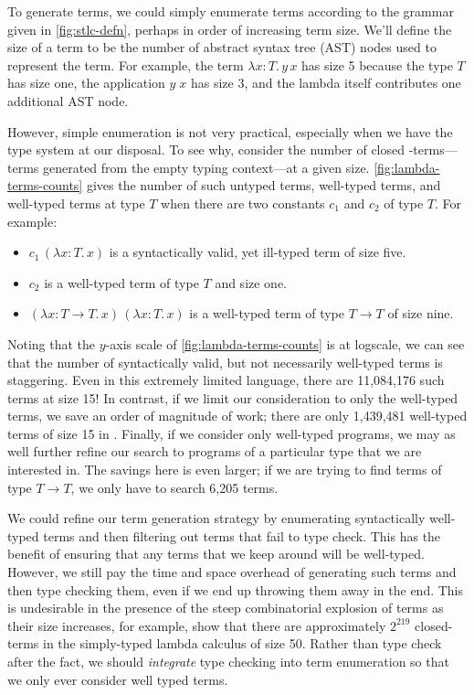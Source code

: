 

To generate \stlc{} terms, we could simply enumerate terms according to the grammar given in \autoref{fig:stlc-defn}, perhaps in order of increasing term size.
We'll define the size of a term to be the number of abstract syntax tree (AST) nodes used to represent the term.
For example, the term $λx{:}T.\,y\,x$ has size 5 because the type $T$ has size one, the application $y\;x$ has size 3, and the lambda itself contributes one additional AST node.

However, simple enumeration is not very practical, especially when we have the type system at our disposal.
To see why, consider the number of closed \stlc-terms---terms generated from the empty typing context---at a given size.
\autoref{fig:lambda-terms-counts} gives the number of such untyped terms, well-typed terms, and well-typed terms at type $T$ when there are two constants $c_1$ and $c_2$ of type $T$.
For example:
\begin{itemize}
  \item $c_1\,(λx{:}T.\,x)$ is a syntactically valid, yet ill-typed term of size five.
  \item $c_2$ is a well-typed term of type $T$ and size one.
  \item $(λx{:}T → T.\,x)\,(λx{:}T.\,x)$ is a well-typed term of type $T → T$ of size nine.
\end{itemize}

Noting that the $y$-axis scale of \autoref{fig:lambda-terms-counts} is at logscale, we can see that the number of syntactically valid, but not necessarily well-typed terms is staggering.
Even in this extremely limited language, there are 11,084,176 such terms at size 15!
In contrast, if we limit our consideration to only the well-typed terms, we save an order of magnitude of work; there are only 1,439,481 well-typed terms of size 15 in \stlc.
Finally, if we consider only well-typed programs, we may as well further refine our search to programs of a particular type that we are interested in.
The savings here is even larger; if we are trying to find terms of type $T → T$, we only have to search 6,205 terms.

We could refine our term generation strategy by enumerating syntactically well-typed terms and then filtering out terms that fail to type check.
This has the benefit of ensuring that any terms that we keep around will be well-typed.
However, we still pay the time and space overhead of generating such terms and then type checking them, even if we end up throwing them away in the end.
This is undesirable in the presence of the steep combinatorial explosion of terms as their size increases, for example, \citet{grygiel-jfp-2013} show that there are approximately $2^{219}$ closed-terms in the simply-typed lambda calculus of size 50.
Rather than type check after the fact, we should \emph{integrate} type checking into term enumeration so that we only ever consider well typed terms.

